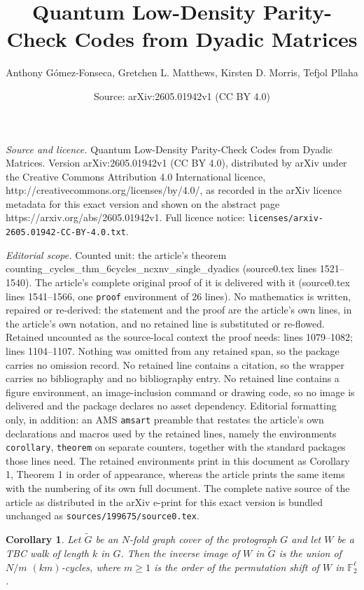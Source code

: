\documentclass[10pt,a4paper]{amsart}
\title{Quantum Low-Density Parity-Check Codes from Dyadic Matrices}
\author{Anthony G\'omez-Fonseca, Gretchen L. Matthews, Kirsten D. Morris, Tefjol Pllaha}
\date{Source: arXiv:2605.01942v1 (CC BY 4.0)}
\newtheorem{corollary}{Corollary}
\begin{document}
\maketitle

\noindent\emph{Source and licence.} Quantum Low-Density Parity-Check Codes from Dyadic Matrices. Version arXiv:2605.01942v1 (CC BY 4.0), distributed by arXiv under the Creative Commons Attribution 4.0 International licence, http://creativecommons.org/licenses/by/4.0/, as recorded in the arXiv licence metadata for this exact version and shown on the abstract page https://arxiv.org/abs/2605.01942v1. Full licence notice: \texttt{licenses/arxiv-2605.01942-CC-BY-4.0.txt}.\par\smallskip

\noindent\textit{Editorial scope.} Counted unit: the article's theorem counting\_cycles\_thm\_6cycles\_ncxnv\_single\_dyadics (source0.tex lines 1521--1540). The article's complete original proof of it is delivered with it (source0.tex lines 1541--1566, one \texttt{proof} environment of 26 lines). No mathematics is written, repaired or re-derived: the statement and the proof are the article's own lines, in the article's own notation, and no retained line is substituted or re-flowed.  Retained uncounted as the source-local context the proof needs: lines 1079--1082; lines 1104--1107.  Nothing was omitted from any retained span, so the package carries no omission record.  No retained line contains a citation, so the wrapper carries no bibliography and no bibliography entry.  No retained line contains a figure environment, an image-inclusion command or drawing code, so no image is delivered and the package declares no asset dependency.  Editorial formatting only, in addition: an AMS \texttt{amsart} preamble that restates the article's own declarations and macros used by the retained lines, namely the environments \texttt{corollary}, \texttt{theorem} on separate counters, together with the standard packages those lines need.  The retained environments print in this document as Corollary 1, Theorem 1 in order of appearance, whereas the article prints the same items with the numbering of its own full document.  The complete native source of the article as distributed in the arXiv e-print for this exact version is bundled unchanged as \texttt{sources/199675/source0.tex}.
\begin{corollary}
\label{counting_cycles_dyadics_preimageTBCwalk_are_cycles}
Let $\tilde{G}$ be an $N$-fold graph cover of the protograph $G$ and let $W$ be a TBC walk of length $k$ in $G$. Then the inverse image of $W$ in $\tilde{G}$ is the union of $N/m$ $(km)$-cycles, where $m\geq 1$ is the order of the permutation shift of $W$ in $\mathbb{F}_2^\ell$.
\end{corollary}
\end{document}
